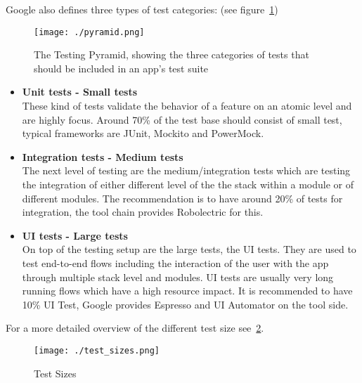 Google also defines three types of test categories: (see figure~\ref{fig_google_pyramid})

\begin{figure}[htb]
	\centering
	\texttt{[image: ./pyramid.png]}
	\caption[The Testing Pyramid, showing the three categories of tests that should be included in an app's test suite]{The Testing Pyramid, showing the three categories of tests that should be included in an app's test suite\footnotemark}
	\label{fig_google_pyramid}
\end{figure}

\begin{itemize}
	\item \textbf{Unit tests - Small tests} \\ 
	These kind of tests validate the behavior of a feature on an atomic level and are highly focus. Around 70\% of the test base should consist of small test, typical frameworks are JUnit, Mockito and PowerMock.
	
	\item \textbf{Integration tests - Medium tests} \\ 
	The next level of testing are the medium/integration tests which are testing the integration of either different level of the the stack within a module or of different modules. The recommendation is to have around 20\% of tests for integration, the tool chain provides Robolectric for this.
	
	\item \textbf{UI tests - Large tests} \\ 
	On top of the testing setup are the large tests, the UI tests. They are used to test end-to-end flows including the interaction of the user with the app through multiple stack level and modules. UI tests are usually very long running flows which have a high resource impact. It is recommended to have 10\% UI Test, Google provides Espresso and UI Automator on the tool side.
\end{itemize}

For a more detailed overview of the different test size see~\ref{fig_google_test_sizes}.

\begin{figure}[htb]
	\centering
	\texttt{[image: ./test\_sizes.png]}
	\caption[Test Sizes]{Test Sizes\footnotemark}
	\label{fig_google_test_sizes}
\end{figure}

